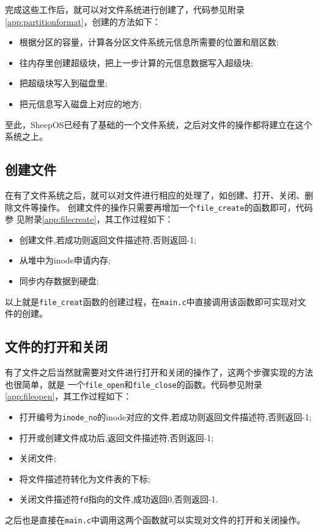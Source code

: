 完成这些工作后，就可以对文件系统\cite{zsn2022}进行创建了，代码参见附录
\ref{app:partitionformat}，创建的方法如下：
\begin{itemize}
\item 根据分区的容量，计算各分区文件系统元信息所需要的位置和扇区数;
\item 往内存里创建超级块，把上一步计算的元信息数据写入超级块;
\item 把超级块写入到磁盘里;
\item 把元信息写入磁盘上对应的地方;
\end{itemize}
至此，SheepOS已经有了基础的一个文件系统，之后对文件的操作都将建立在这个系统之上。

\subsection{创建文件}
在有了文件系统之后，就可以对文件进行相应的处理了，如创建、打开、关闭、删除文件等操作。
创建文件的操作只需要再增加一个\texttt{file\_create}的函数即可，代码参
见附录\ref{app:filecreate}，其工作过程如下：
\begin{itemize}
\item 创建文件,若成功则返回文件描述符,否则返回-1;
\item 从堆中为inode申请内存;
\item 同步内存数据到硬盘;
\end{itemize}
以上就是\texttt{file\_creat}函数的创建过程，在\texttt{main.c}中直接调用该函数即可实现对文件的创建。

\subsection{文件的打开和关闭}
有了文件之后当然就需要对文件进行打开和关闭的操作了，这两个步骤实现的方法也很简单，就是
一个\texttt{file\_open}和\texttt{file\_close}的函数。代码参见附录
\ref{app:fileopen}，其工作过程如下：
\begin{itemize}
\item 打开编号为\texttt{inode\_no}的inode对应的文件,若成功则返回文件描述符,否则返回-1;
\item 打开或创建文件成功后,返回文件描述符,否则返回-1;
\item 关闭文件;
\item 将文件描述符转化为文件表的下标;
\item 关闭文件描述符\texttt{fd}指向的文件,成功返回0,否则返回-1.
\end{itemize}

之后也是直接在\texttt{main.c}中调用这两个函数就可以实现对文件的打开和关闭操作。

